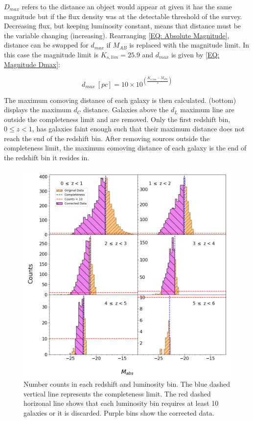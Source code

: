 $D_{max}$ refers to the distance an object would appear at given it has the same magnitude but if the flux density was at the detectable threshold of the survey. Decreasing flux, but keeping luminosity constant, means that distance must be the variable changing (increasing). Rearranging \cref{EQ: Absolute Magnitude}, distance can be swapped for $d_{max}$ if $M_{AB}$ is replaced with the magnitude limit. In this case the magnitude limit is $K_{s,lim} = 25.9$ and $d_{max}$ is given by \cref{EQ: Magnitude Dmax}:

\begin{equation}
    d_{max}\ [pc] = 10 \times 10^{\textstyle{\left(\frac{K_{s,lim} - M_{abs}}{5}\right)}}
    \label{EQ: Magnitude Dmax}
\end{equation}

The maximum comoving distance of each galaxy is then calculated.  (bottom) displays the maximum $d_C$ distance. Galaxies above the $d_L$ maximum line are outside the completeness limit and are removed. Only the first redshift bin, $0 \leq z < 1$, has galaxies faint enough such that their maximum distance does not reach the end of the redshift bin. After removing sources outside the completeness limit, the maximum comoving distance of each galaxy is the end of the redshift bin it resides in. 

\begin{figure}[b!]
    \centering
    \includegraphics[width=\textwidth]{Figures/Magnitude Counts.png}
    \caption{Number counts in each redshift and luminosity bin. The blue dashed vertical line represents the completeness limit. The red dashed horizonal line shows that each luminosity bin requires at least 10 galaxies or it is discarded. Purple bins show the corrected data.}
    \label{Fig: Magnitude Counts}
\end{figure}

